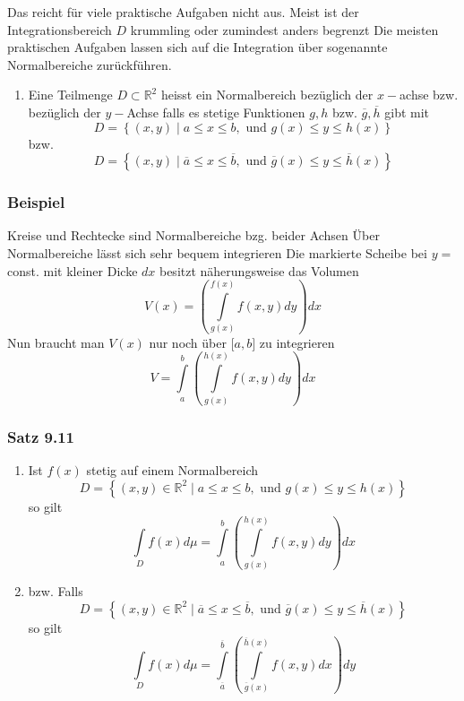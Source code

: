 Das reicht für viele praktische Aufgaben nicht aus. Meist ist der Integrationsbereich $D$ krummling oder zumindest anders begrenzt
Die meisten praktischen Aufgaben lassen sich auf die Integration über sogenannte Normalbereiche zurückführen.

\begin{definition}{9.10}
\begin{enumerate}
\item Eine Teilmenge $D\subset\mathbb{R}^2$ heisst ein Normalbereich bezüglich der $x-$achse bzw. bezüglich der $y-$Achse falls es stetige Funktionen $g,h$ bzw. $\overline{g},\overline{h}$ gibt mit
\[D=\left\{ \left( x,y\right)\mid a\leq x\leq b,\text{ und }g(x)\leq y\leq h(x)\right\}\] 
bzw.
\[D=\left\{ \left( x,y\right)\mid \overline{a}\leq x\leq \overline{b},\text{ und }\overline{g}(x)\leq y\leq \overline{h}(x)\right\}\]
\end{enumerate}
\end{definition}

\subsubsection*{Beispiel}
Kreise und Rechtecke sind Normalbereiche bzg. beider Achsen 
Über Normalbereiche lässt sich sehr bequem integrieren 
Die markierte Scheibe bei $y=$const. mit kleiner Dicke $dx$ besitzt näherungsweise das Volumen
\[V(x) = \left( {\int\limits_{g(x)}^{f(x)} {f\left( {x,y} \right)dy} } \right)dx\]
Nun braucht man $V(x)$ nur noch über $\lbrack a,b\rbrack$ zu integrieren\[V = \int\limits_a^b {\left( {\int\limits_{g(x)}^{h(x)} {f\left( {x,y} \right)dy} } \right)dx} \]

\subsubsection*{Satz 9.11}
\begin{enumerate}
\item Ist $f(x)$ stetig auf einem Normalbereich \[D=\left\{ \left( x,y\right)\in\mathbb{R}^2\mid a\leq x\leq b,\text{ und }g(x)\leq y\leq h(x)\right\}\] 
so gilt 
\[\int\limits_D {f(x)d\mu  = \int\limits_a^b {\left( {\int\limits_{g(x)}^{h(x)} {f\left( {x,y} \right)dy} } \right)dx} } \]
\item bzw. Falls \[D=\left\{ \left( x,y\right)\in\mathbb{R}^2\mid \overline{a}\leq x\leq \overline{b},\text{ und }\overline{g}(x)\leq y\leq \overline{h}(x)\right\}\]
so gilt 
\[\int\limits_D {f(x)d\mu  = \int\limits_{\overline{a}}^{\overline{b}} {\left( {\int\limits_{\overline{g}(x)}^{\overline{h}(x)} {f\left( {x,y} \right)dx} } \right)dy} } \]
\end{enumerate}
